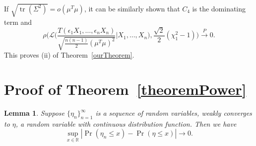 \documentclass[3p]{elsarticle}
\DeclareMathOperator{\mytr}{tr}
\theoremstyle{plain}
\newtheorem{lemma}{Lemma}
\theoremstyle{definition}
\theoremstyle{remark}
\begin{document}
    If $\sqrt{\mytr(\Sigma^2)}=o(\mu^T \mu)$, it can be similarly shown that $C_4$ is the dominating term and 
    $$
                \rho\Bigg(\mathcal{L}\bigg(\frac{T(\epsilon_1 X_1,\ldots,\epsilon_n X_n)}{\sqrt{\frac{n(n-1)}{2}(\mu^T \mu)^2}}\bigg| X_1,\ldots,X_n\bigg),\frac{\sqrt{2}}{2}(\chi^2_1-1)\Bigg)
            \xrightarrow{P} 0.
    $$
    This proves (ii) of Theorem~\ref{ourTheorem}.




\section{Proof of Theorem~\ref{theoremPower}}
\begin{lemma}\label{lemmaUniformSimple}
    Suppose $\{\eta_n\}_{n=1}^{\infty}$ is a sequence of random variables, weakly converges to $\eta$, a random variable with continuous distribution function.
    Then we have
    \begin{equation*}
        \sup_{x\in\mathbb{R}}|\Pr(\eta_n\leq x)-\Pr(\eta\leq x)|\to 0.
    \end{equation*}
\end{lemma}
\end{document}
